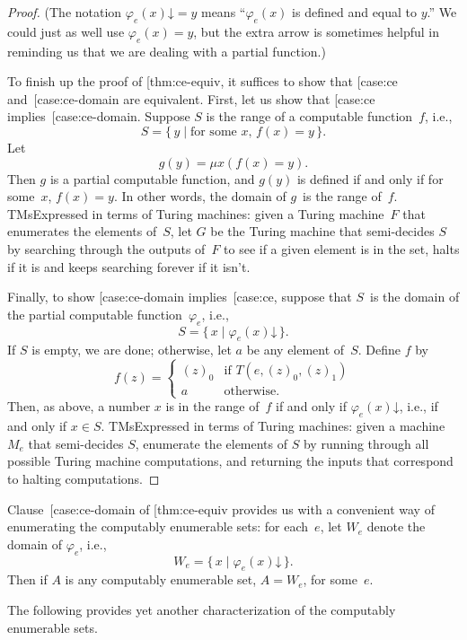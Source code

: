 \documentclass[10pt,a4paper]{article}
\makeatletter
\theoremstyle{plain}
\theoremstyle{definition}
\theoremstyle{remark}
\newcommand{\olref}{\@ifnextchar[{\olref@i}{\olref@final}}
\def\olref@i[#1]{\@ifnextchar[{\olref@ii}{\olref@final}}
\def\olref@ii[#1]{\@ifnextchar[{\olref@iii}{\olref@final}}
\def\olref@iii[#1]{\olref@final}
\def\olref@final#1{\ref{#1}}
\providecommand{\cfind}[1]{\varphi_{#1}}
\providecommand{\iftag}[1]{#1}
\providecommand{\fdefined}{\mathord{\downarrow}}
\providecommand{\Setabs}[2]{\{\, #1 \mid #2 \,\}}
\providecommand{\umin}{\mu}
\makeatother
\begin{document}
\begin{proof}
(The notation $\cfind{e}(x) \fdefined = y$ means ``$\cfind{e}(x)$ is
defined and equal to $y$.'' We could just as well use $\cfind{e}(x) =
y$, but the extra arrow is sometimes helpful in reminding us that we
are dealing with a partial function.)

To finish up the proof of \olref{thm:ce-equiv}, it suffices to show
that \olref{case:ce} and~\olref{case:ce-domain} are equivalent. First,
let us show that \olref{case:ce} implies~\olref{case:ce-domain}.
Suppose $S$ is the range of a computable function~$f$, i.e.,
\[
S = \Setabs{y}{\text{for some $x$, } f(x) = y}.
\]
Let
\[
g(y) = \umin{x}{(f(x) = y)}.
\]
Then $g$ is a partial computable function, and $g(y)$ is defined if
and only if for some~$x$, $f(x) = y$. In other words, the domain of
$g$~is the range of~$f$. \iftag{TMs}{Expressed in terms of Turing
machines: given a Turing machine~$F$ that enumerates the elements
of~$S$, let $G$ be the Turing machine that semi-decides $S$ by
searching through the outputs of~$F$ to see if a given element is in
the set, halts if it is and keeps searching forever if it isn't.}{}

Finally, to show \olref{case:ce-domain} implies~\olref{case:ce},
suppose that $S$~is the domain of the partial computable
function~$\cfind{e}$, i.e.,
\[
S = \Setabs{x}{\cfind{e}(x) \fdefined}.
\]
If $S$ is empty, we are done; otherwise, let $a$ be any element
of~$S$. Define $f$ by
\[
f(z) = \begin{cases}
(z)_0 & \text{if $T(e,(z)_0,(z)_1)$} \\
a & \text{otherwise.}
\end{cases}
\]
Then, as above, a number $x$ is in the range of~$f$ if and only if
$\cfind{e}(x) \fdefined$, i.e., if and only if $x \in S$. \iftag{TMs}{Expressed
in terms of Turing machines: given a machine $M_e$ that semi-decides
$S$, enumerate the elements of $S$ by running through all possible
Turing machine computations, and returning the inputs that correspond
to halting computations.}{}
\end{proof}

Clause~\olref{case:ce-domain} of \olref{thm:ce-equiv} provides us with
a convenient way of enumerating the computably enumerable sets: for
each~$e$, let $W_e$ denote the domain of $\cfind{e}$, i.e.,
\[
W_e = \Setabs{x}{\cfind{e}(x) \fdefined}.
\] 
Then if $A$ is any computably enumerable set, $A = W_e$, for some~$e$.

The following provides yet another characterization of the computably
enumerable sets.
\end{document}
